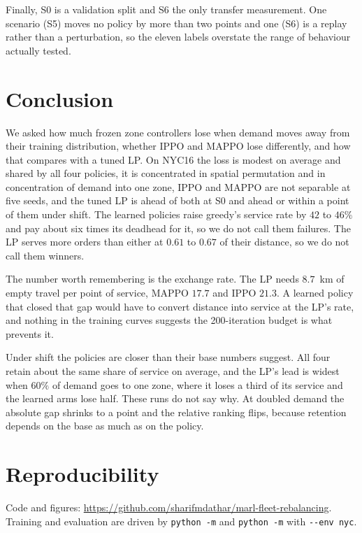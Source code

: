 \documentclass[conference]{IEEEtran}
\begin{document}
Finally, S0 is a validation split and S6 the only transfer measurement. One
scenario (S5) moves no policy by more than two points and one (S6) is a replay
rather than a perturbation, so the eleven labels overstate the range of
behaviour actually tested.

\section{Conclusion}
\label{sec:conclusion}

We asked how much frozen zone controllers lose when demand moves away from
their training distribution, whether IPPO and MAPPO lose differently, and how
that compares with a tuned LP. On NYC16 the loss is modest on average and
shared by all four policies, it is concentrated in spatial permutation and in
concentration of demand into one zone, IPPO and MAPPO are not separable at
five seeds, and the tuned LP is ahead of both at S0 and ahead or within a
point of them under shift. The learned policies raise greedy's service rate by
$42$ to $46\%$ and pay about six times its deadhead for it, so we do not call
them failures. The LP serves more orders than either at $0.61$ to $0.67$ of
their distance, so we do not call them winners.

The number worth remembering is the exchange rate. The LP needs $8.7$~km of
empty travel per point of service, MAPPO $17.7$ and IPPO $21.3$. A learned
policy that closed that gap would have to convert distance into service at the
LP's rate, and nothing in the training curves suggests the 200-iteration
budget is what prevents it.

Under shift the policies are closer than their base numbers suggest. All four
retain about the same share of service on average, and the LP's lead is widest
when $60\%$ of demand goes to one zone, where it loses a third of its service
and the learned arms lose half. These runs do not say why. At doubled demand
the absolute gap shrinks to a point and the relative ranking flips, because
retention depends on the base as much as on the policy.

\section*{Reproducibility}
\begingroup
\raggedright

Code and figures: \url{https://github.com/sharifmdathar/marl-fleet-rebalancing}.
Training and evaluation are driven by
\texttt{python -m}  and
\texttt{python -m}  with
\texttt{-{}-env nyc}.
\end{document}
